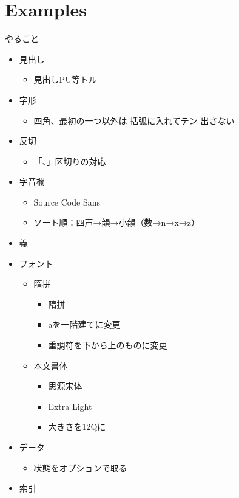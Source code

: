 \documentclass[a5paper,10pt]{article}
\begin{document}
\part{Examples}
やること
\begin{itemize}
\item{} 見出し
  \begin{itemize}
  \item{} 見出しPU等トル
  \end{itemize}
\item 字形
  \begin{itemize}
  \item{} 四角、最初の一つ以外は 括弧に入れてテン 出さない
  \end{itemize}
\item{} 反切
  \begin{itemize}
  \item{} 「、」区切りの対応
  \end{itemize}
\item{} 字音欄
  \begin{itemize}
  \item{} Source Code Sans
  \item ソート順：四声→韻→小韻（数→n→x→z）
  \end{itemize}
\item{} 義
\item{} フォント
  \begin{itemize}
  \item{} 隋拼
    \begin{itemize}
    \item{} 隋拼
    \item{} aを一階建てに変更
    \item{} 重調符を下から上のものに変更
    \end{itemize}
  \item{} 本文書体
    \begin{itemize}
    \item{} 思源宋体
    \item{} Extra Light
    \item{} 大きさを12Qに
    \end{itemize}
  \end{itemize}
\item{} データ
  \begin{itemize}
  \item{} 状態をオプションで取る
  \end{itemize}
\item{} 索引
  \begin{itemize}

\end{itemize}
\end{itemize}
\end{document}

